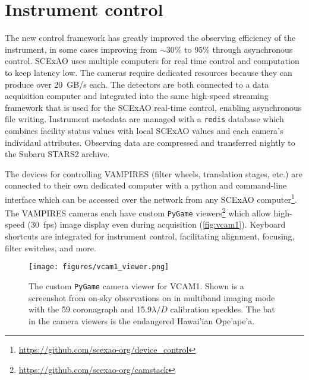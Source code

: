 \section{Instrument control}\label{sec:control}

The new control framework has greatly improved the observing efficiency of the instrument, in some cases improving from $\sim$30\% to 95\% through asynchronous control. SCExAO uses multiple computers for real time control and computation to keep latency low. The cameras require dedicated resources because they can produce over \SI{20}{GB/s} each. The detectors are both connected to a data acquisition computer and integrated into the same high-speed streaming framework that is used for the SCExAO real-time control, enabling asynchronous file writing. Instrument metadata are managed with a \texttt{redis} database which combines facility status values with local SCExAO values and each camera's individaul attributes. Observing data are compressed and transferred nightly to the Subaru STARS2 archive.

The devices for controlling VAMPIRES (filter wheels, translation stages, etc.) are connected to their own dedicated computer with a python and command-line interface which can be accessed over the network from any SCExAO computer\footnote{\url{https://github.com/scexao-org/device_control}}. The VAMPIRES cameras each have custom \texttt{PyGame} viewers\footnote{\url{https://github.com/scexao-org/camstack}} which allow high-speed (\SI{30}{fps}) image display even during acquisition (\autoref{fig:vcam1}). Keyboard shortcuts are integrated for instrument control, facilitating alignment, focusing, filter switches, and more.

\begin{figure}
    \centering
    \texttt{[image: figures/vcam1\_viewer.png]}
    \caption{The custom \texttt{PyGame} camera viewer for VCAM1. Shown is a screenshot from on-sky observations on  in multiband imaging mode with the \SI{59}{\mas} coronagraph and 15.9$\lambda/D$ calibration speckles. The bat in the camera viewers is the endangered Hawai'ian Ope'ape'a.\label{fig:vcam1}}
\end{figure}
